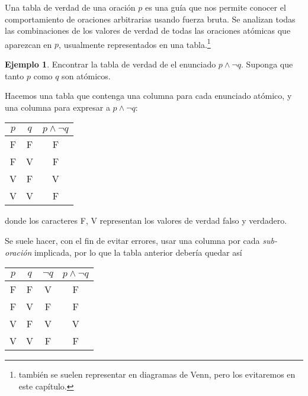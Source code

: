 \documentclass{book}
\theoremstyle{definition}
\newtheorem{ejm}{Ejemplo}[chapter]
\begin{document}
Una tabla de verdad de una oración $p$ es una guía que nos permite conocer el comportamiento de oraciones arbitrarias usando fuerza bruta.
Se analizan todas las combinaciones de los valores de verdad de todas las oraciones atómicas que aparezcan en $p$, usualmente representados en una tabla.\footnote{también se suelen representar en diagramas de Venn, pero los evitaremos en este capítulo.}
\begin{ejm}
	Encontrar la tabla de verdad de el enunciado $p \wedge \neg q$. Suponga que tanto $p$ como $q$ son atómicos.
	
	Hacemos una tabla que contenga una columna para cada enunciado atómico, y una columna para expresar a $p \wedge \neg q$:

	\begin{center}\begin{tabular}{|c|c|c|}
		\hline
		$p$& $q$ & $p \wedge \neg q$ \\
		\hline \hline
		F & F & F \\
		\hline
		F & V & F \\
		\hline
		V & F & V \\
		\hline
		V & V & F \\
		\hline
	\end{tabular}\end{center}
	donde los caracteres F, V representan los valores de verdad falso y verdadero.
	
	Se suele hacer, con el fin de evitar errores, usar una columna por cada \emph{sub-oración} implicada, por lo que la tabla anterior debería quedar así
	\begin{center}\begin{tabular}{|c|c|c|c|}
		\hline
		$p$& $q$ & $\neg q$ &$p \wedge \neg q$ \\
		\hline \hline
		F & F & V & F \\
		\hline
		F & V & F & F \\
		\hline
		V & F & V & V \\
		\hline
		V & V & F & F \\
		\hline
\end{tabular}\end{center} 
\end{ejm}
\end{document}
